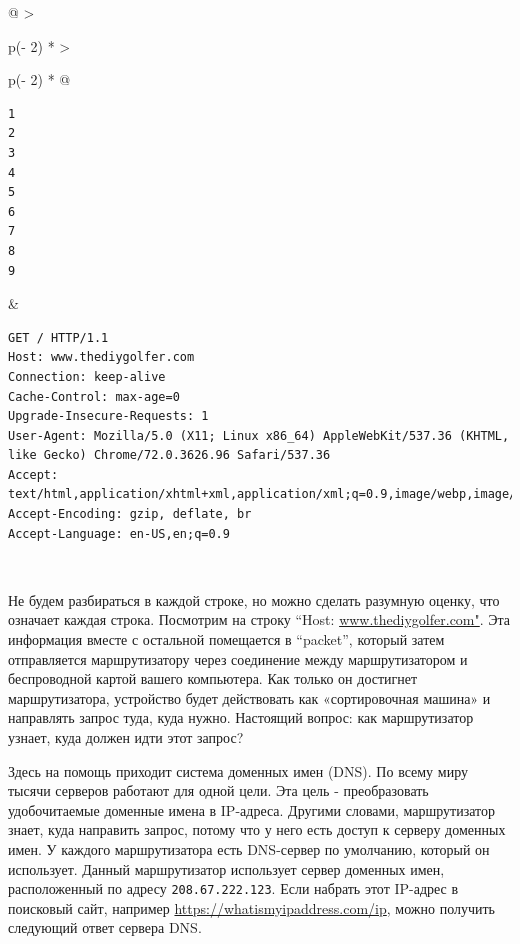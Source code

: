 \documentclass{article}
\begin{document}
\begin{longtable}[]{@{}
  >{\raggedright\arraybackslash}p{(\columnwidth - 2\tabcolsep) * }
  >{\raggedright\arraybackslash}p{(\columnwidth - 2\tabcolsep) * }@{}}
\toprule
\endhead
\begin{minipage}[t]{\linewidth}\raggedright
\begin{verbatim}
1
2
3
4
5
6
7
8
9
\end{verbatim}
\end{minipage} & \begin{minipage}[t]{\linewidth}\raggedright
\begin{verbatim}
GET / HTTP/1.1
Host: www.thediygolfer.com
Connection: keep-alive
Cache-Control: max-age=0
Upgrade-Insecure-Requests: 1
User-Agent: Mozilla/5.0 (X11; Linux x86_64) AppleWebKit/537.36 (KHTML, like Gecko) Chrome/72.0.3626.96 Safari/537.36
Accept: text/html,application/xhtml+xml,application/xml;q=0.9,image/webp,image/apng,*/*;q=0.8
Accept-Encoding: gzip, deflate, br
Accept-Language: en-US,en;q=0.9
\end{verbatim}
\end{minipage} \\ \addlinespace
\bottomrule
\end{longtable}

Не будем разбираться в каждой строке, но можно сделать разумную оценку,
что означает каждая строка. Посмотрим на строку ``Host:
\href{http://www.thediygolfer.com}{www.thediygolfer.com"}. Эта
информация вместе с остальной помещается в ``packet'', который затем
отправляется маршрутизатору через соединение между маршрутизатором и
беспроводной картой вашего компьютера. Как только он достигнет
маршрутизатора, устройство будет действовать как «сортировочная машина»
и направлять запрос туда, куда нужно. Настоящий вопрос: как
маршрутизатор узнает, куда должен идти этот запрос?

Здесь на помощь приходит система доменных имен (DNS). По всему миру
тысячи серверов работают для одной цели. Эта цель - преобразовать
удобочитаемые доменные имена в IP-адреса. Другими словами, маршрутизатор
знает, куда направить запрос, потому что у него есть доступ к серверу
доменных имен. У каждого маршрутизатора есть DNS-сервер по умолчанию,
который он использует. Данный маршрутизатор использует сервер доменных
имен, расположенный по адресу \texttt{208.67.222.123}. Если набрать этот
IP-адрес в поисковый сайт, например
\url{https://whatismyipaddress.com/ip}, можно получить следующий ответ
сервера DNS.
\end{document}
